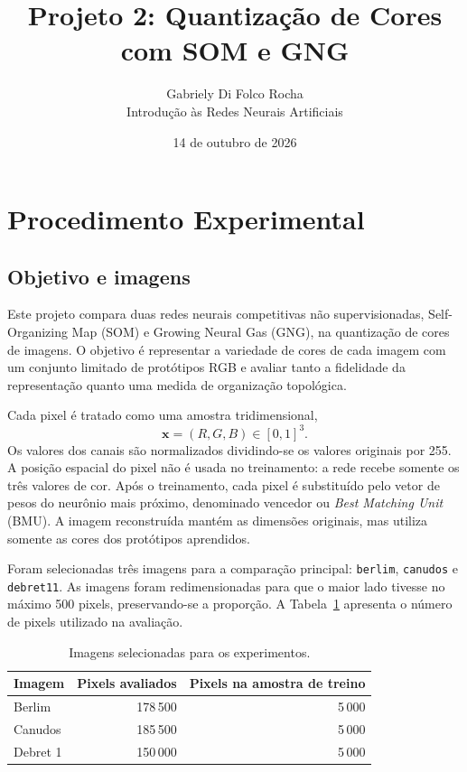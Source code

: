 \documentclass[11pt,a4paper]{article}
\title{Projeto 2: Quantização de Cores com SOM e GNG}
\author{Gabriely Di Folco Rocha\\
\small Introdução às Redes Neurais Artificiais}
\date{14 de outubro de 2026}
\begin{document}
\maketitle

\section{Procedimento Experimental}

\subsection{Objetivo e imagens}

Este projeto compara duas redes neurais competitivas não supervisionadas,
Self-Organizing Map (SOM) e Growing Neural Gas (GNG), na quantização de cores
de imagens. O objetivo é representar a variedade de cores de cada imagem com
um conjunto limitado de protótipos RGB e avaliar tanto a fidelidade da
representação quanto uma medida de organização topológica.

Cada pixel é tratado como uma amostra tridimensional,
\[
\mathbf{x}=(R,G,B)\in[0,1]^3.
\]
Os valores dos canais são normalizados dividindo-se os valores originais por
255. A posição espacial do pixel não é usada no treinamento: a rede recebe
somente os três valores de cor. Após o treinamento, cada pixel é substituído
pelo vetor de pesos do neurônio mais próximo, denominado vencedor ou
\textit{Best Matching Unit} (BMU). A imagem reconstruída mantém as dimensões
originais, mas utiliza somente as cores dos protótipos aprendidos.

Foram selecionadas três imagens para a comparação principal: \texttt{berlim},
\texttt{canudos} e \texttt{debret11}. As imagens foram redimensionadas para que
o maior lado tivesse no máximo 500 pixels, preservando-se a proporção. A
Tabela~\ref{tab:images} apresenta o número de pixels utilizado na avaliação.

\begin{table}[H]
\centering
\caption{Imagens selecionadas para os experimentos.}
\label{tab:images}
\begin{tabular}{lrr}
\toprule
Imagem & Pixels avaliados & Pixels na amostra de treino\\
\midrule
Berlim & 178\,500 & 5\,000\\
Canudos & 185\,500 & 5\,000\\
Debret 1 & 150\,000 & 5\,000\\
\bottomrule
\end{tabular}
\end{table}
\end{document}
